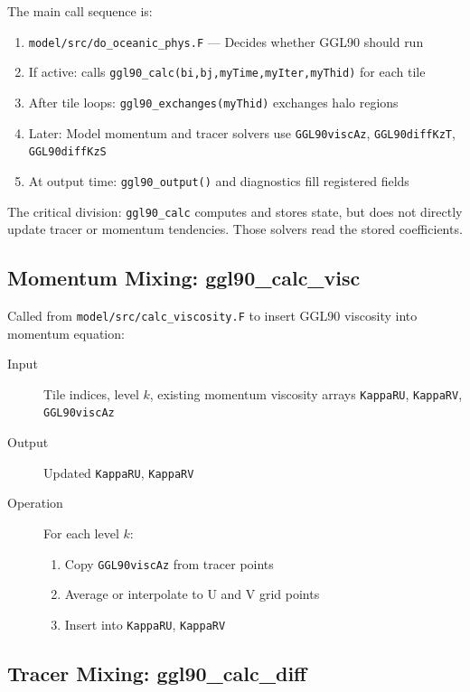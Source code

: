 \documentclass[11pt, a4paper]{article}
\begin{document}
The main call sequence is:

\begin{enumerate}
    \item \texttt{model/src/do\_oceanic\_phys.F} — Decides whether GGL90 should run
    \item If active: calls \texttt{ggl90\_calc(bi,bj,myTime,myIter,myThid)} for each tile
    \item After tile loops: \texttt{ggl90\_exchanges(myThid)} exchanges halo regions
    \item Later: Model momentum and tracer solvers use \texttt{GGL90viscAz}, \texttt{GGL90diffKzT}, \texttt{GGL90diffKzS}
    \item At output time: \texttt{ggl90\_output()} and diagnostics fill registered fields
\end{enumerate}

The critical division: \texttt{ggl90\_calc} computes and stores state, but does not directly update tracer or momentum tendencies. Those solvers read the stored coefficients.

\subsection{Momentum Mixing: ggl90\_calc\_visc}

Called from \texttt{model/src/calc\_viscosity.F} to insert GGL90 viscosity into momentum equation:

\begin{description}
    \item[Input] Tile indices, level $k$, existing momentum viscosity arrays \texttt{KappaRU}, \texttt{KappaRV}, \texttt{GGL90viscAz}
    \item[Output] Updated \texttt{KappaRU}, \texttt{KappaRV}
    \item[Operation] For each level $k$:
    \begin{enumerate}
        \item Copy \texttt{GGL90viscAz} from tracer points
        \item Average or interpolate to U and V grid points
        \item Insert into \texttt{KappaRU}, \texttt{KappaRV}
    \end{enumerate}
\end{description}

\subsection{Tracer Mixing: ggl90\_calc\_diff}
\end{document}
